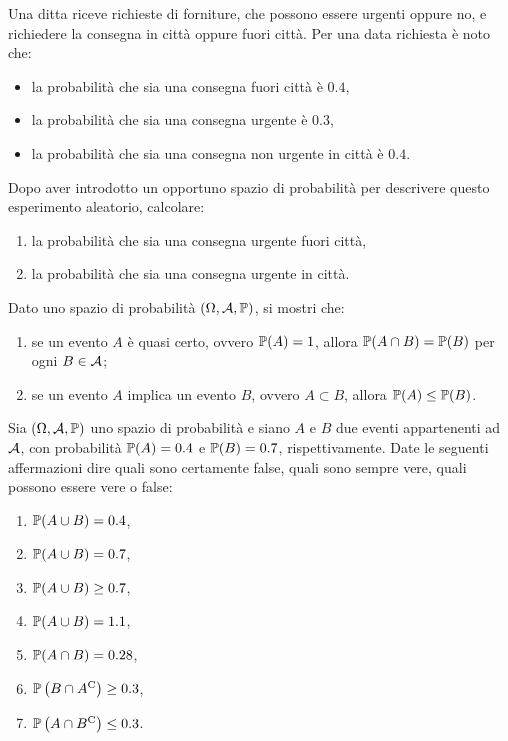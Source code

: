 \Esercizio{}

Una ditta riceve richieste di forniture, che possono essere urgenti oppure no, e richiedere la consegna in città oppure fuori città. Per una data richiesta è noto che:
\begin{itemize}
	\item la probabilità che sia una consegna fuori città è $0.4$,
	\item la probabilità che sia una consegna urgente è $0.3$,
	\item la probabilità che sia una consegna non urgente in città è $0.4$.
\end{itemize}
Dopo aver introdotto un opportuno spazio di probabilità per descrivere questo esperimento aleatorio, calcolare:
\begin{enumerate}
	\item la probabilità che sia una consegna urgente fuori città,
	\item la probabilità che sia una consegna urgente in città.
\end{enumerate}

\Esercizio{}

Dato uno spazio di probabilità $(\Omega,\mathcal{A},\mathbb{P})$, si mostri che:
\begin{enumerate}
	\item se un evento $A$ è quasi certo, ovvero $\mathbb{P}(A) =1$, allora $\mathbb{P}(A\cap B) =\mathbb{P}(B)$ per ogni $B\in \mathcal{A}$;
	\item se un evento $A$ implica un evento $B$, ovvero $A\subset B$, allora $\mathbb{P}(A) \leq \mathbb{P}(B)$.
\end{enumerate}

\Esercizio{}

Sia $(\Omega,\mathcal{A},\mathbb{P})$ uno spazio di probabilità e siano $A$ e $B$ due eventi appartenenti ad $\mathcal{A}$, con probabilità $\mathbb{P}(A) =0.4$ e $\mathbb{P}(B) =0.7$, rispettivamente. Date le seguenti affermazioni dire quali sono certamente false, quali sono sempre vere, quali possono essere vere o false:
\begin{enumerate}
	\item $\mathbb{P}(A\cup B) =0.4$,
	\item $\mathbb{P}(A\cup B) =0.7$,
	\item $\mathbb{P}(A\cup B) \geq 0.7$,
	\item $\mathbb{P}(A\cup B) =1.1$,
	\item $\mathbb{P}(A\cap B) =0.28$,
	\item $\mathbb{P}\left(B\cap A^{\mathrm{C}}\right) \geq 0.3$,
	\item $\mathbb{P}\left(A\cap B^{\mathrm{C}}\right) \leq 0.3$.
\end{enumerate}

